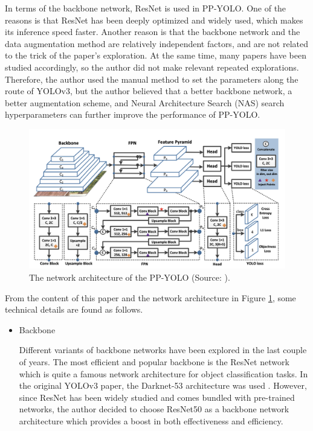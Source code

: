 \documentclass[sensors,article,submit,moreauthors,pdftex]{Definitions/mdpi}
\begin{document}
In terms of the backbone network, ResNet is used in PP-YOLO. One of the reasons is that ResNet has been deeply optimized and widely used, which makes its inference speed faster. Another reason is that the backbone network and the data augmentation method are relatively independent factors, and are not related to the trick of the paper's exploration. At the same time, many papers have been studied accordingly, so the author did not make relevant repeated explorations. Therefore, the author used the manual method to set the parameters along the route of YOLOv3, but the author believed that a better backbone network, a better augmentation scheme, and Neural Architecture Search (NAS) search hyperparameters can further improve the performance of PP-YOLO.


\begin{figure}[htbp]
\centering
\includegraphics[width=1\columnwidth]{images/PP-YOLO architecture.png}
\caption{The network architecture of the PP-YOLO (Source: \cite{long2020pp}).}
\label{fig:network architecture}
\end{figure}

From the content of this paper and the network architecture in Figure \ref{fig:network architecture}, some technical details are found as follows.

\begin{itemize}
\item{Backbone}

Different variants of backbone networks have been explored in the last couple of years. The most efficient and popular backbone is the ResNet network which is quite a famous network architecture for object classification tasks. In the original YOLOv3 paper, the Darknet-53 architecture was used \cite{he2016deep}. However, since ResNet has been widely studied and comes bundled with pre-trained networks, the author decided to choose ResNet50 as a backbone network architecture which provides a boost in both effectiveness and efficiency.

\end{itemize}
\end{document}
